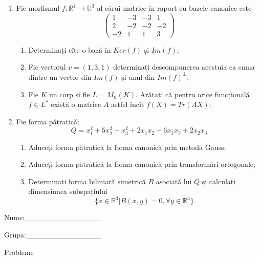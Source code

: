 \documentclass{article}
\begin{document}
\begin{enumerate}
 \item Fie morfismul $f:\mathbb{R}^4 \to \mathbb{R}^3$ al cărui matrice în raport cu bazele canonice este
$$\begin{pmatrix}
1&-3&-3&1\\
2&-2&-2&-2\\
-2&1&1&3
\end{pmatrix}$$

\begin{enumerate}
\item Determinați cîte o bază în $Ker(f)$ și $Im(f)$;
\item Fie vectorul $v=(1,3,1)$ determinați descompunerea acestuia ca suma dintre un vector din $Im(f)$ și unul din $Im(f)^\perp$;
\item Fie $K$ un corp și fie $L=M_n(K)$. Arătați că pentru orice funcțională $f \in L^*$ există o matrice $A$ astfel încît $f(X)=Tr(AX)$;
\end{enumerate}
\item Fie forma pătratică:
$$Q= x_1^2+5x_2^2+x_3^2+2x_1x_2+6x_1x_3+2x_2x_3$$

\begin{enumerate}
\item Aduceți forma pătratică la forma canonică prin metoda Gauss;
\item Aduceți forma pătratică la forma canonică prin transformări ortogonale;
\item Determinați forma biliniară simetrică $B$ asociată lui $Q$ și calculați dimensiunea subspațiului
$$\{x \in \mathbb{R}^3 | B(x,y)=0,\forall y \in \mathbb{R}^3\}.$$

\end{enumerate}
\end{enumerate}
\newpage
\begin{flushright}
Nume:\_\_\_\_\_\_\_\_\_\_\_\_\_\_
 
 
Grupa:\_\_\_\_\_\_\_\_\_\_\_\_\_\_
\end{flushright}
\begin{center}
\vspace{2cm}
{\Large Probleme}
\vspace{2cm}
\end{center}
\end{document}

